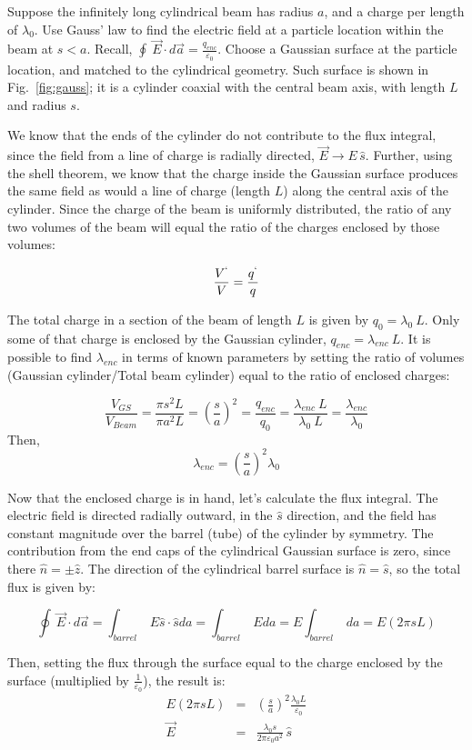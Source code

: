 \documentclass[12pt]{article}
\begin{document}
\begin{flushleft}
Suppose the infinitely long cylindrical beam has radius $a$, and a charge per length of $\lambda_{0}$.  Use Gauss' law to find the electric field at a particle location within the beam at $s<a$.  Recall, $\oint \: \vec{E}\cdot d\vec{a} = \frac{q_{enc}}{\varepsilon_{0}}$.  Choose a Gaussian surface at the particle location, and matched to the cylindrical geometry.  Such surface is shown in Fig.~\ref{fig:gauss}; it is a cylinder coaxial with the central beam axis, with length $L$ and radius $s$. 

We know that the ends of the cylinder do not contribute to the flux integral, since the field from a line of charge is radially directed, $\vec{E} \rightarrow E\,\hat{s}$.  Further, using the shell theorem, we know that the charge inside the Gaussian surface produces the same field as would a line of charge (length $L$) along the central axis of the cylinder.  Since the charge of the beam is uniformly distributed, the ratio of any two volumes of the beam will equal the ratio of the charges enclosed by those volumes:

\[
\frac{V^{`}}{V}=\frac{q^{`}}{q}
\]

The total charge in a section of the beam of length $L$ is given by $q_{0} = \lambda_{0} \: L$.  Only some of that charge is enclosed by the Gaussian cylinder, $q_{enc} = \lambda_{enc} \: L$.  It is possible to find $\lambda_{enc}$ in terms of known parameters by setting the ratio of volumes (Gaussian cylinder/Total beam cylinder) equal to the ratio of enclosed charges:

\[
\frac{V_{GS}}{V_{Beam}}=\frac{\pi s^{2}L}{\pi a^{2} L} = \left(\frac{s}{a}\right)^{2} =\frac{q_{enc}}{q_{0}} = 
\frac{ \lambda_{enc} \: L}{ \lambda_{0} \: L}  
= \frac{ \lambda_{enc} }{\lambda_{0}} 
\]
Then,
\[
\lambda_{enc} = \left(\frac{s}{a}\right)^{2}\lambda_{0}
\]

Now that the enclosed charge is in hand, let's calculate the flux integral.  The electric field is directed radially outward, in the $\hat{s}$ direction, and the field has constant magnitude over the barrel (tube) of the cylinder by symmetry.  The contribution from the end caps of the cylindrical Gaussian surface is zero, since there $\hat{n}=\pm \hat{z}$.  The direction of the cylindrical barrel surface is $\hat{n}=\hat{s}$, so the total flux is given by:

\[
\oint \: \vec{E}\cdot d\vec{a} = \int_{barrel} \: E\hat{s}\cdot \hat{s}da =\int_{barrel} \: Eda = E \int_{barrel} \: da = E (2\pi sL)
\]

Then, setting the flux through the surface equal to the charge enclosed by the surface (multiplied by $\frac{1}{\varepsilon_{0} }$), the result is:
\begin{eqnarray}
E (2\pi sL) & = & \left(\frac{s}{a}\right)^{2}\frac{\lambda_{0}L}{\varepsilon_{0}} \nonumber \\
\vec{E}  & = & \frac{\lambda_{0}s}{ 2\pi \varepsilon_{0} a^{2} } \, \hat{s} \label{eq:beam_efield}
\end{eqnarray}



\end{flushleft}
\end{document}
